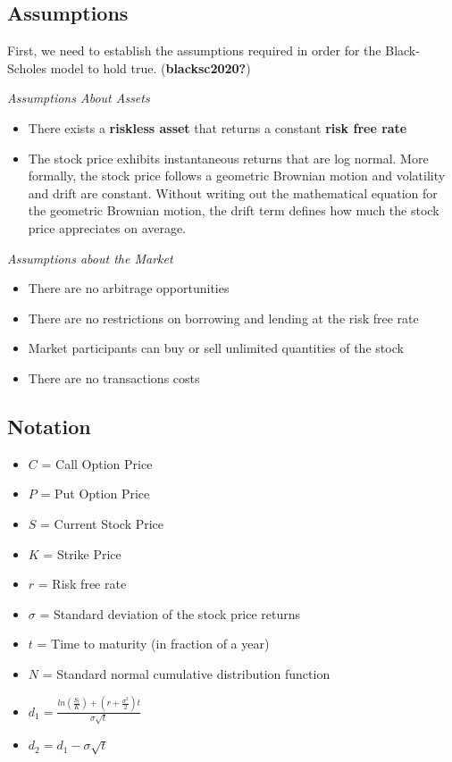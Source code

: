 \documentclass[
  letterpaper,
  DIV=11,
  numbers=noendperiod]{scrreprt}
\begin{document}
\hypertarget{assumptions}{%
\subsection{Assumptions}\label{assumptions}}

First, we need to establish the assumptions required in order for the
Black-Scholes model to hold true. (\textbf{blacksc2020?})

\emph{Assumptions About Assets}

\begin{itemize}
\item
  There exists a \textbf{riskless asset} that returns a constant
  \textbf{risk free rate}
\item
  The stock price exhibits instantaneous returns that are log normal.
  More formally, the stock price follows a geometric Brownian motion and
  volatility and drift are constant. Without writing out the
  mathematical equation for the geometric Brownian motion, the drift
  term defines how much the stock price appreciates on average.
\end{itemize}

\emph{Assumptions about the Market}

\begin{itemize}
\item
  There are no arbitrage opportunities
\item
  There are no restrictions on borrowing and lending at the risk free
  rate
\item
  Market participants can buy or sell unlimited quantities of the stock
\item
  There are no transactions costs
\end{itemize}

\hypertarget{notation}{%
\subsection{Notation}\label{notation}}

\begin{itemize}
\item
  \(C\) = Call Option Price
\item
  \(P\) = Put Option Price
\item
  \(S\) = Current Stock Price
\item
  \(K\) = Strike Price
\item
  \(r\) = Risk free rate
\item
  \(\sigma\) = Standard deviation of the stock price returns
\item
  \(t\) = Time to maturity (in fraction of a year)
\item
  \(N\) = Standard normal cumulative distribution function
\item
  \(d_{1} = \frac{ln(\frac{S_{t}}{K}) + (r + \frac{\sigma^{2}}{2})t}{\sigma \sqrt{t}}\)
\item
  \(d_{2} = d_{1} - \sigma \sqrt{t}\)
\end{itemize}
\end{document}
